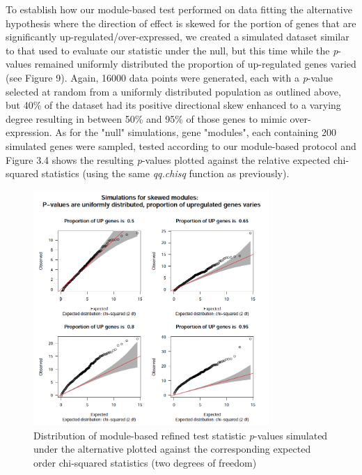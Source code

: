 
To establish how our module-based test performed on data fitting the alternative hypothesis where the direction of effect is skewed for the portion of genes that are significantly up-regulated/over-expressed, we created a simulated dataset similar to that used to evaluate our statistic under the null, but this time while the \textit{p}-values remained uniformly distributed the proportion of up-regulated genes varied (see Figure 9). Again, 16000 data points were generated, each with a \textit{p}-value selected at random from a uniformly distributed population as outlined above, but 40\% of the dataset had its positive directional skew enhanced to a varying degree resulting in between 50\% and 95\% of those genes to mimic over-expression. As for the "null" simulations, gene "modules", each containing 200 simulated genes were sampled, tested according to our module-based protocol and Figure 3.4 shows the resulting \textit{p}-values plotted against the relative expected chi-squared statistics (using the same \textit{qq.chisq} function as previously).

\begin{figure}[H] 
    \centering
\includegraphics[width=0.8\textwidth]{Figures/Chapter3/simulated_alternative_skewedDir.png}
\caption{\small{Distribution of module-based refined test statistic \textit{p}-values simulated under the alternative plotted against the corresponding expected order chi-squared statistics (two degrees of freedom)} }
    \label{fig:10}
\end{figure}

